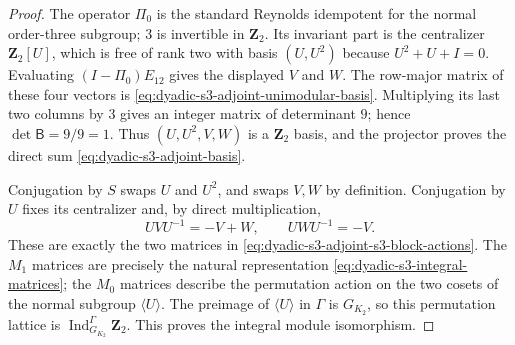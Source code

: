 \documentclass[11pt]{article}
\theoremstyle{definition}
\begin{document}
\begin{proof}
The operator $\Pi_0$ is the
standard Reynolds idempotent
for the normal order-three
subgroup; $3$ is invertible in
$\mathbf Z_2$.  Its invariant
part is the centralizer
$\mathbf Z_2[U]$, which is free
of rank two with basis $(U,U^2)$
because $U^2+U+I=0$.
Evaluating $(I-\Pi_0)E_{12}$
gives the displayed $V$ and $W$.
The row-major matrix of these
four vectors is
\eqref{eq:dyadic-s3-adjoint-unimodular-basis}.
Multiplying its last two
columns by $3$ gives an
integer matrix of determinant $9$;
hence $\det\mathsf B=9/9=1$.
Thus $(U,U^2,V,W)$ is a
$\mathbf Z_2$ basis, and the
projector proves the direct sum
\eqref{eq:dyadic-s3-adjoint-basis}.

Conjugation by $S$ swaps
$U$ and $U^2$, and swaps $V,W$
by definition.  Conjugation by
$U$ fixes its centralizer
and, by direct multiplication,
\[
 UVU^{-1}=-V+W,\qquad
 UWU^{-1}=-V.
\]
These are exactly the two
matrices in
\eqref{eq:dyadic-s3-adjoint-s3-block-actions}.
The $M_1$ matrices are precisely
the natural representation
\eqref{eq:dyadic-s3-integral-matrices};
the $M_0$ matrices describe the
permutation action on the two
cosets of the normal subgroup
$\langle U\rangle$.
The preimage of $\langle U\rangle$
in $\Gamma$ is $G_{K_2}$,
so this permutation lattice is
$\operatorname{Ind}_{G_{K_2}}^\Gamma
\mathbf Z_2$.
This proves the integral
module isomorphism.
\end{proof}
\end{document}
